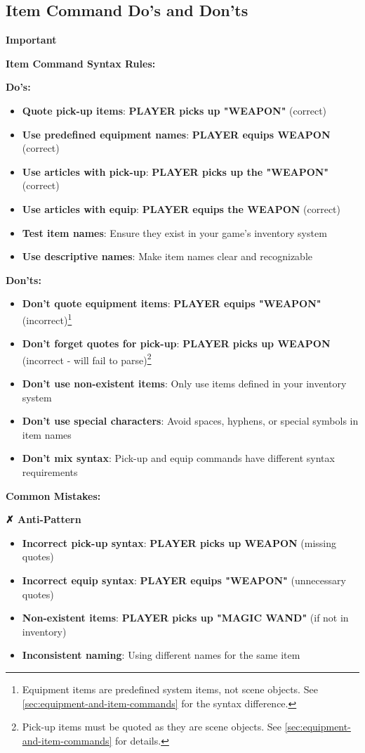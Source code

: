 \documentclass[11pt,letterpaper,oldstylefigures]{memoir}
\newenvironment{AntiPattern}
{\begingroup
\small
\setlength{\parindent}{0pt}
\setlength{\parskip}{0.5em}
\allowdisplaybreaks
\setlength{\displaywidowpenalty}{0}
\setlength{\widowpenalty}{0}
\setlength{\clubpenalty}{0}
\setlength{\interlinepenalty}{0}
\begin{tcolorbox}[
    colback=red!5,
    colframe=red!75!black,
    boxrule=0.5pt,
    arc=2pt,
    left=0.5em,
    right=0.5em,
    top=0.25em,
    bottom=0.25em
]
\textbf{✗ Anti-Pattern}
\end{tcolorbox}\par
}
{\endgroup}
\newenvironment{Important}
{\begingroup
\small
\setlength{\parindent}{0pt}
\setlength{\parskip}{0.5em}
\allowdisplaybreaks
\setlength{\displaywidowpenalty}{0}
\setlength{\widowpenalty}{0}
\setlength{\clubpenalty}{0}
\setlength{\interlinepenalty}{0}
\begin{tcolorbox}[
    colback=yellow!5,
    colframe=yellow!75!black,
    boxrule=0.5pt,
    arc=2pt,
    left=0.5em,
    right=0.5em,
    top=0.25em,
    bottom=0.25em
]
\textbf{Important}
\end{tcolorbox}\par
}
{\endgroup}
\newcommand{\fountain}[1]{\textbf{#1}}
\begin{document}
\subsection{Item Command Do's and Don'ts}

\begin{Important}
\textbf{Item Command Syntax Rules:}
\end{Important}

\textbf{Do's:}
\begin{itemize}
\item \textbf{Quote pick-up items}: \fountain{PLAYER picks up "WEAPON"} (correct)
\item \textbf{Use predefined equipment names}: \fountain{PLAYER equips WEAPON} (correct)
\item \textbf{Use articles with pick-up}: \fountain{PLAYER picks up the "WEAPON"} (correct)
\item \textbf{Use articles with equip}: \fountain{PLAYER equips the WEAPON} (correct)
\item \textbf{Test item names}: Ensure they exist in your game's inventory system
\item \textbf{Use descriptive names}: Make item names clear and recognizable
\end{itemize}

\textbf{Don'ts:}
\begin{itemize}
\item \textbf{Don't quote equipment items}: \fountain{PLAYER equips "WEAPON"} (incorrect)\footnote{Equipment items are predefined system items, not scene objects. See \autoref{sec:equipment-and-item-commands} for the syntax difference.}
\item \textbf{Don't forget quotes for pick-up}: \fountain{PLAYER picks up WEAPON} (incorrect - will fail to parse)\footnote{Pick-up items must be quoted as they are scene objects. See \autoref{sec:equipment-and-item-commands} for details.}
\item \textbf{Don't use non-existent items}: Only use items defined in your inventory system
\item \textbf{Don't use special characters}: Avoid spaces, hyphens, or special symbols in item names
\item \textbf{Don't mix syntax}: Pick-up and equip commands have different syntax requirements
\end{itemize}

\textbf{Common Mistakes:}
\begin{AntiPattern}
\begin{itemize}
\item \textbf{Incorrect pick-up syntax}: \fountain{PLAYER picks up WEAPON} (missing quotes)
\item \textbf{Incorrect equip syntax}: \fountain{PLAYER equips "WEAPON"} (unnecessary quotes)
\item \textbf{Non-existent items}: \fountain{PLAYER picks up "MAGIC WAND"} (if not in inventory)
\item \textbf{Inconsistent naming}: Using different names for the same item
\end{itemize}
\end{AntiPattern}
\end{document}

